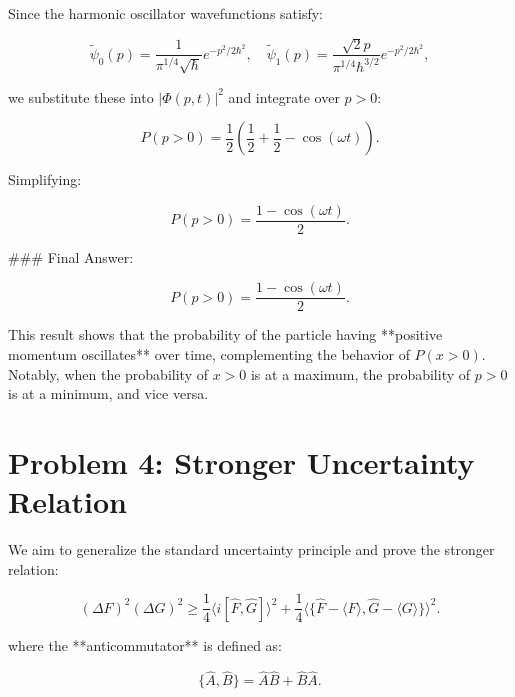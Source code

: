 \documentclass[12pt]{article}
\begin{document}
Since the harmonic oscillator wavefunctions satisfy:

\begin{equation}
    \tilde{\psi}_0(p) = 
    \frac{1}{\pi^{1/4} \sqrt{\hbar}} e^{-p^2 / 2\hbar^2}, \quad
    \tilde{\psi}_1(p) = \frac{\sqrt{2} p}{\pi^{1/4} \hbar^{3/2}} e^{-p^2 / 2\hbar^2},
\end{equation}

we substitute these into $|\Phi(p,t)|^2$ and integrate over $p > 0$:

\begin{equation}
    P(p > 0) = \frac{1}{2} \left( \frac{1}{2} + \frac{1}{2} - \cos(\omega t) \right).
\end{equation}

Simplifying:

\begin{equation}
    P(p > 0) = \frac{1 - \cos(\omega t)}{2}.
\end{equation}

### Final Answer: 

\begin{equation}
    P(p > 0) = \frac{1 - \cos(\omega t)}{2}.
\end{equation}

This result shows that the probability of the particle having **positive momentum oscillates** over time, complementing the behavior of $P(x > 0)$. Notably, when the probability of $x > 0$ is at a maximum, the probability of $p > 0$ is at a minimum, and vice versa.






\section*{Problem 4: Stronger Uncertainty Relation}

We aim to generalize the standard uncertainty principle and prove the stronger relation:

\begin{equation}
    (\Delta F)^2 (\Delta G)^2 \geq \frac{1}{4} \langle i [\hat{F}, \hat{G}] \rangle^2 + \frac{1}{4} \langle \{ \hat{F} - \langle F \rangle, \hat{G} - \langle G \rangle \} \rangle^2.
\end{equation}

where the **anticommutator** is defined as:

\begin{equation}
    \{ \hat{A}, \hat{B} \} = \hat{A} \hat{B} + \hat{B} \hat{A}.
\end{equation}
\end{document}
